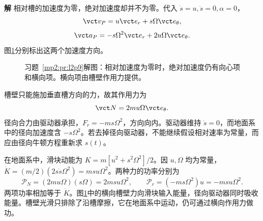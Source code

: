 \documentclass[11pt,openany,fontset=fandol]{ctexbook}
\theoremstyle{definition}\newtheorem{example}{例}[chapter]\newtheorem{exercise}{习题}[chapter]
\newcommand{\SolutionStart}{\par\medskip\ifdim\pagetotal>0pt\ifdim\dimexpr\pagegoal-\pagetotal\relax<3\baselineskip\newpage\fi\fi\noindent\textbf{解}\quad\ignorespaces}
\newenvironment{solution}{\SolutionStart}{\par\medskip}
\begin{document}
\begin{solution}
相对槽的加速度为零，绝对加速度却并不为零。代入 $\dot s=u,\ddot s=0,\alpha=0$，
\[
\vct v_P=u\vct e_r+s\Omega\vct e_\theta,
\]
\[
\vct a_P=-s\Omega^2\vct e_r+2u\Omega\vct e_\theta.
\]
图\ref{mp2:fig:l2p9-s}分别标出这两个加速度方向。

\begin{figure}[H]\centering
{}
\caption{习题~\ref{mp2:pr:l2p9}解图：相对加速度为零时，绝对加速度仍有向心项和横向项。横向项由槽壁作用力提供。}\label{mp2:fig:l2p9-s}
\end{figure}

槽壁只能施加垂直槽方向的力，故其作用力为
\[
\vct N=2mu\Omega\vct e_\theta.
\]
径向合力由驱动器承担，$F_r=-ms\Omega^2$，方向向内。驱动器维持 $\ddot s=0$，而地面系中的径向加速度含 $-s\Omega^2$。若去掉径向驱动器，不能继续假设相对速率为常量，而应由径向牛顿方程重新求 $s(t)$。

在地面系中，滑块动能为 $K=m[u^2+s^2\Omega^2]/2$。因 $u,\Omega$ 均为常量，$\dot K=(m/2)(2s\dot s\Omega^2)=msu\Omega^2$。两种力的功率分别为
\[
 \mathcal P_N=(2mu\Omega)(s\Omega)=2msu\Omega^2,
 \qquad\mathcal P_r=(-ms\Omega^2)u=-msu\Omega^2.
\]
两项功率相加等于 $\dot K$。图\ref{mp2:fig:l2p9-s}中的横向槽壁力向滑块输入能量，径向驱动器同时吸收能量。槽壁光滑只排除了沿槽摩擦，它在地面系中运动，仍可通过横向作用力做功。
\end{solution}
\end{document}
